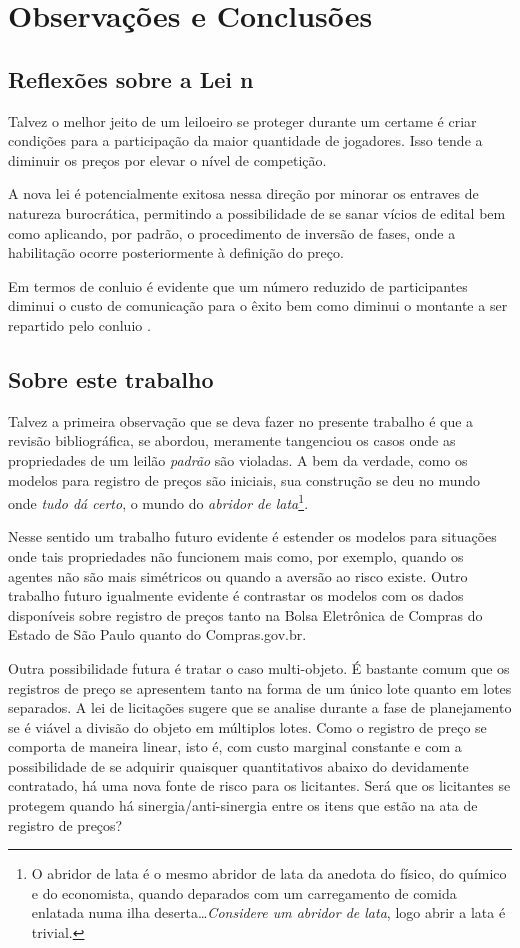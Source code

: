\chapter{Observações e Conclusões}
\label{cap:conclusoes}

\section{Reflexões sobre a Lei n}
Talvez o melhor jeito de um leiloeiro se proteger durante um certame é criar condições para a participação da maior quantidade de jogadores. Isso tende a diminuir os preços por elevar o nível de competição.

A nova lei é potencialmente exitosa nessa direção por minorar os entraves de natureza burocrática, permitindo a possibilidade de se sanar vícios de edital bem como aplicando, por padrão, o procedimento de inversão de fases, onde a habilitação ocorre posteriormente à definição do preço.

Em termos de conluio é evidente que um número reduzido de participantes diminui o custo de comunicação para o êxito bem como diminui o montante a ser repartido pelo conluio \citet{pellegrini2018:MSc}.

\section{Sobre este trabalho}

Talvez a primeira observação que se deva fazer no presente trabalho é que a revisão bibliográfica, se abordou, meramente tangenciou os casos onde as propriedades de um leilão \emph{padrão} são violadas. A bem da verdade, como os modelos para registro de preços são iniciais, sua construção se deu no mundo onde \emph{tudo dá certo}, o mundo do \emph{abridor de lata}\footnote{O abridor de lata é o mesmo abridor de lata da anedota do físico, do químico e do economista, quando deparados com um carregamento de comida enlatada numa ilha deserta\ldots \emph{Considere um abridor de lata}, logo abrir a lata é trivial.}.

Nesse sentido um trabalho futuro evidente é estender os modelos para situações onde tais propriedades não funcionem mais como, por exemplo, quando os agentes não são mais simétricos ou quando a aversão ao risco existe. Outro trabalho futuro igualmente evidente é contrastar os modelos com os dados disponíveis sobre registro de preços tanto na Bolsa Eletrônica de Compras do Estado de São Paulo quanto do Compras.gov.br.

Outra possibilidade futura é tratar o caso multi-objeto. É bastante comum que os registros de preço se apresentem tanto na forma de um único lote quanto em lotes separados. A lei de licitações sugere que se analise durante a fase de planejamento se é viável a divisão do objeto em múltiplos lotes. Como o registro de preço se comporta de maneira linear, isto é, com custo marginal constante e com a possibilidade de se adquirir quaisquer quantitativos abaixo do devidamente contratado, há uma nova fonte de risco para os licitantes. Será que os licitantes se protegem quando há sinergia/anti-sinergia entre os itens que estão na ata de registro de preços?